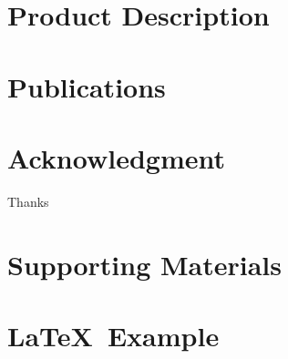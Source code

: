 \documentclass{book}
\begin{document}
\appendix

\chapter{Product Description}







\chapter{Publications}   %


\chapter{Acknowledgment}
\label{SpecialThanks}  
Thanks  

\chapter{Supporting Materials}


\backmatter

%

\chapter{\LaTeX\ Example}

\end{document}
